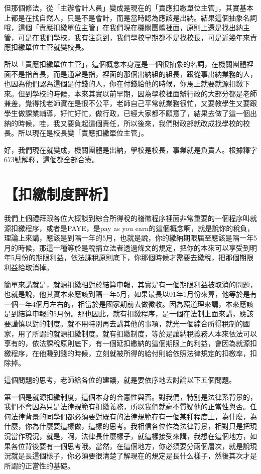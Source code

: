 \documentclass[oneside,sub3section]{ctexbook}
\begin{document}
但那個修法，從「主辦會計人員」變成是現在的「責應扣繳單位主管」，其實基本上都是在找自然人，只是不是會計，而是當時認為應該是出納。結果這個抽象名詞哦，這個「責應扣繳單位主管」在我們現在機關團體裡面，原則上還是找出納主管，可是在我們學校，我有注意到，我們學校早期都不是找校長，可是近幾年來責應扣繳單位主管就變校長。

所以「責應扣繳單位主管」，這個概念本身還是一個很抽象的名詞，在機關團體裡面不是指首長，而是通常是指，裡面的那個出納組的組長，跟從事出納業務的人，也因為他們認為這個是付錢的人，你在付錢給他的時候，你馬上就要就源扣繳下來。但到學校的時候，本來其實以前早期，因為學校裡面辦行政的大部分都是老師兼差，覺得找老師實在是很不公平，老師自己平常就業務很忙，又要教學生又要跟學生做課業輔導，好忙好忙，做行政，已經大家都不願意了，結果去做了這一個出納的時候，哇，我又要負起這個責任，所以後來，我們財政部就改成找學校的校長。所以現在是校長變「責應扣繳單位主管」。

好，我們現在就變成，機關團體是出納，學校是校長，事業就是負責人。根據釋字673號解釋，這個都全部合憲。

\hypertarget{ux6263ux7e73ux5236ux5ea6ux8a55ux6790}{%
\section{【扣繳制度評析】}\label{ux6263ux7e73ux5236ux5ea6ux8a55ux6790}}

我們上個禮拜跟各位大概談到綜合所得稅的稽徵程序裡面非常重要的一個程序叫就源扣繳程序，或者是PAYE，是pay as you earn的這個概念啊，就是說你的稅負，理論上來講，應該是到隔一年的5月，也就是說，你的繳納期限屆至應該是隔一年5月的時候，那這一種等於是稅捐立法者透過條文的規定，把你的本來可以享受到明年5月份的期限利益，依法課稅原則底下，你那個時候才需要去繳稅，把那個期限利益給取消掉。

簡單來講就是，就源扣繳相對於結算申報，其實是有一個期限利益被取消的問題，也就是說，他其實本來應該到隔一年5月，如果最長以01年1月份來算，他等於是有一個一年4個月左右的，相當於是國家期前去做徵收。因為照道理來講，本來應該是到結算申報的5月份。那也因此，就有扣繳程序，是一個在法制上面來講，應該要謹慎以對的制度。就不用特別再去講其他的事項，就光一個綜合所得稅制的國家，用了所謂的就源扣繳制度。就有扣繳制度，等於是讓納稅義務人本來依法可以享有的，依法課稅原則底下，有一個延扣繳納的這個期限上的利益，會因為就源扣繳程序，在他賺到錢的時候，立刻就被所得的給付則給依照法律規定的扣繳率，扣除掉。

這個問題的思考，老師給各位的建議，就是要依序地去討論以下五個問題。

第一個是就源扣繳制度，這個本身的合憲性與否。對我們，特別是法律系背景的，我們不會因為只是法律規範有扣繳義務，所以我們就毫不質疑他的正當性與否。任何法律背景的同學們都必須要對既有的法律規範存有一個某種程度上，為什麼，為什麼，你為什麼要這樣做，這樣的思考。我相信各位作為法律背景，相對只是把現況當作現況，就是，啊，法律長什麼樣子，就這樣接受來講，我想在這個地方，如果各位背後要有一個思考哦。當然，在這個地方，你必須要分兩個層次，就是說現況就是長這個樣子，你必須要很清楚了解現在的規定是長什么樣子，然後其次才是所謂的正當性的基礎。
\end{document}
